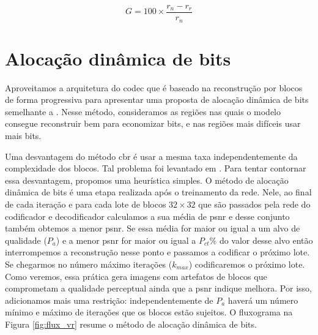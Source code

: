 \begin{equation}
\label{eq:gain_ce}
G = 100 \times \frac{r_n-r_r}{r_n}
\end{equation}


\section{Alocação dinâmica de bits}\label{sec:adb}

Aproveitamos a arquitetura do \acrshort{codec} que é baseado na reconstrução por blocos de forma progressiva para apresentar uma proposta de alocação dinâmica de bits semelhante a \cite{Priming2017Johnston}. Nesse método, consideramos as regiões nas quais o modelo consegue reconstruir bem para economizar bits, e nas regiões  mais difíceis usar mais bits. 


Uma desvantagem do método \acrshort{cbr} é usar a mesma taxa independentemente da complexidade dos blocos. Tal problema foi levantado em \cite{Priming2017Johnston}. Para tentar contornar essa desvantagem, propomos uma heurística simples.
O método de alocação dinâmica de bits é uma etapa realizada após o treinamento da rede. Nele, ao final de cada iteração e para cada lote de blocos $32 \times 32$ que são passados pela rede do codificador e decodificador calculamos a sua média de \acrshort{psnr} e desse conjunto também obtemos a menor \acrshort{psnr}. Se essa média for maior ou igual a um alvo de qualidade ($P_{a}$) e a menor \acrshort{psnr} for maior ou igual a $P_{ct}$\% do valor desse alvo então interrompemos a reconstrução nesse ponto e passamos a codificar o próximo lote. Se chegarmos no número máximo iterações ($k_{max}$) codificaremos o próximo lote.
Como veremos, essa prática gera imagens com artefatos de blocos que comprometam a qualidade perceptual ainda que a \acrshort{psnr} indique melhora. Por isso, adicionamos mais uma restrição: independentemente de $P_{a}$ haverá um número mínimo e máximo de iterações que os blocos estão sujeitos. O fluxograma na Figura \ref{fig:flux_vr} resume o método de alocação dinâmica de bits. 


